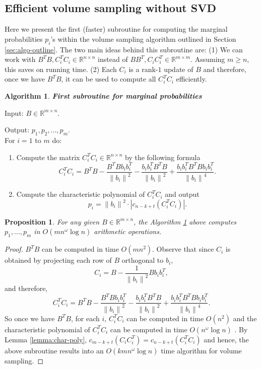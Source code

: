 \documentclass[11pt]{article}
\newtheorem{prop}[theorem]{Proposition}
\newtheorem{alg}{Algorithm}
\def\reals{\mathbb{R}}
\newcommand{\norm}[1]{\left\|#1\right\|}
\newcommand{\abs}[1]{\left|#1\right|}
\begin{document}
\subsection{Efficient volume sampling without SVD} \label{subsec:no-svd}
Here we present the first (faster) subroutine for computing the marginal probabilities $p_{i}$'s within the volume sampling algorithm outlined in Section \ref{sec:algo-outline}. The two main ideas behind this subroutine are: (1) We can work with $B^{T}B, C_{i}^{T} C_i \in \reals^{n \times n}$ instead of $BB^{T}, C_{i} C_{i}^{T} \in \reals^{m \times m}$. Assuming $m \geq n$, this saves on running time. (2) Each $C_{i}$ is a rank-$1$ update of $B$ and therefore, once we have $B^{T}B$, it can be used to compute all $C_{i}^{T} C_{i}$ efficiently.

\begin{framed}
\begin{alg}\label{alg:omegaSub}
{\bf First subroutine for marginal probabilities}
\end{alg}
\noindent Input: $B \in \reals^{m \times n}$.

\noindent Output: $p_{1}, p_{2}, \dotsc, p_{m}$. \\

For $i=1$ to $m$ do:
\begin{enumerate}
\item Compute the matrix $C_{i}^T C_{i} \in \reals^{n \times n}$ by the following formula
\[
C_{i}^{T} C_{i} = B^{T} B - \frac{B^{T} B b_{i} b_{i}^{T}}{\norm{b_{i}}^{2}} - \frac{b_{i} b_{i}^{T} B^{T} B}{\norm{b_{i}}^{2}} + \frac{b_{i} b_{i}^{T} B^{T} B b_{i} b_{i}^{T}}{\norm{b_{i}}^{4}}.
\]
\item Compute the characteristic polynomial of $C_{i}^{T} C_{i}$ and output
\[
p_{i} = \norm{b_{i}}^{2} \cdot \abs{c_{n-k+t} (C_{i}^{T} C_{i})}.
\]
\end{enumerate}
\end{framed}

\begin{prop} \label{prop:omegaVS}
For any given $B \in \reals^{m \times n}$, the Algorithm \ref{alg:omegaSub} above computes $p_{1}, \dotsc, p_{m}$ in $O(mn^{\omega} \log n)$ arithmetic operations.
\end{prop}
\begin{proof}
$B^{T}B$ can be computed in time $O(mn^{2})$. Observe that since $C_{i}$ is obtained by projecting each row of $B$ orthogonal to $b_{i}$,
\[
C_{i} = B - \frac{1}{\norm{b_{i}}^{2}} Bb_{i}b_{i}^{T},
\]
and therefore,
\[
C_{i}^{T} C_{i} = B^{T} B - \frac{B^{T} B b_{i} b_{i}^{T}}{\norm{b_{i}}^{2}} - \frac{b_{i} b_{i}^{T} B^{T} B}{\norm{b_{i}}^{2}} + \frac{b_{i} b_{i}^{T} B^{T} B b_{i} b_{i}^{T}}{\norm{b_{i}}^{4}}.
\]
So once we have $B^{T}B$, for each $i$, $C_{i}^{T} C_{i}$ can be computed in time $O(n^{2})$ and the characteristic polynomial of $C_{i}^{T} C_{i}$ can be computed in time $O(n^{\omega} \log n)$ \cite[Section 16.6]{ACT}. By Lemma \ref{lemma:char-poly}, $c_{m-k+t} (C_{i} C_{i}^{T}) = c_{n-k+t} (C_{i}^{T} C_{i})$ and hence, the above subroutine results into an $O(kmn^{\omega} \log n)$ time algorithm for volume sampling.
\end{proof}
\end{document}
